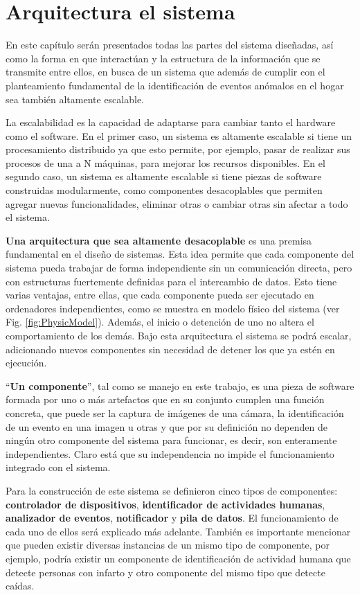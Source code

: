 \chapter{Arquitectura el sistema}
\label{chap:SystemArchitecture}

En este capítulo serán presentados todas las partes del sistema diseñadas, así como la forma en que interactúan y la estructura de la información que se transmite entre ellos, en busca de un sistema que además de cumplir con el planteamiento fundamental de la identificación de eventos anómalos en el hogar sea también altamente escalable.

La escalabilidad es la capacidad de adaptarse para cambiar tanto el hardware como el software. En el primer caso, un sistema es altamente escalable si tiene un procesamiento distribuido ya que esto permite, por ejemplo, pasar de realizar sus procesos de una a N máquinas, para mejorar los recursos disponibles. En el segundo caso, un sistema es altamente escalable si tiene piezas de software construidas modularmente, como componentes desacoplables que permiten agregar nuevas funcionalidades, eliminar otras o cambiar otras sin afectar a todo el sistema.

\textbf{Una arquitectura que sea altamente desacoplable} es una premisa fundamental en el diseño de sistemas. Esta idea permite que cada componente del sistema pueda trabajar de forma independiente sin un comunicación directa, pero con estructuras fuertemente definidas para el intercambio de datos. Esto tiene varias ventajas, entre ellas, que cada componente pueda ser ejecutado en ordenadores independientes, como se muestra en modelo físico del sistema (ver Fig. \ref{fig:PhysicModel}). Además, el inicio o detención de uno no altera el comportamiento de los demás. Bajo esta arquitectura el sistema se podrá escalar, adicionando nuevos componentes sin necesidad de detener los que ya estén en ejecución.

``\textbf{Un componente}'', tal como se manejo en este trabajo, es una pieza de software formada por uno o más artefactos que en su conjunto cumplen una función concreta, que puede ser la captura de imágenes de una cámara, la identificación de un evento en una imagen u otras y que por su definición no dependen de ningún otro componente del sistema para funcionar, es decir, son enteramente independientes. Claro está que su independencia no impide el funcionamiento integrado con el sistema. 

Para la construcción de este sistema se definieron cinco tipos de componentes: \textbf{controlador de dispositivos}, \textbf{identificador de actividades humanas}, \textbf{analizador de eventos}, \textbf{notificador} y \textbf{pila de datos}. El funcionamiento de cada uno de ellos será explicado más adelante. También es importante mencionar que pueden existir diversas instancias de un mismo tipo de componente, por ejemplo, podría existir un componente de identificación de actividad humana que detecte personas con infarto y otro componente del mismo tipo que detecte caídas.

